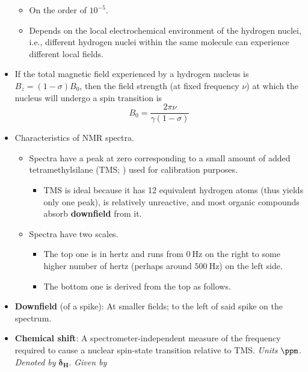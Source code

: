 \documentclass[../notes.tex]{subfiles}
\begin{document}
\begin{itemize}
    \begin{itemize}
        \item On the order of $10^{-5}$.
        \item {}Depends on the local electrochemical environment of the hydrogen nuclei, i.e., different hydrogen nuclei within the same molecule can experience different local fields.
    \end{itemize}
    \item If the total magnetic field experienced by a hydrogen nucleus is $B_z=(1-\sigma)B_0$, then the field strength (at fixed frequency $\nu$) at which the nucleus will undergo a spin transition is
    \begin{equation*}
        B_0 = \frac{2\pi\nu}{\gamma(1-\sigma)}
    \end{equation*}
    \item Characteristics of NMR spectra.
    \begin{itemize}
        \item Spectra have a peak at zero corresponding to a small amount of added tetramethylsilane (TMS; ) used for calibration purposes.
        \begin{itemize}
            \item TMS is ideal because it has 12 equivalent hydrogen atoms (thus yields only one peak), is relatively unreactive, and most organic compounds absorb \textbf{downfield} from it.
        \end{itemize}
        \item Spectra have two scales.
        \begin{itemize}
            \item The top one is in hertz and runs from $\SI{0}{\hertz}$ on the right to some higher number of hertz (perhaps around $\SI{500}{\hertz}$) on the left side.
            \item The bottom one is derived from the top as follows.
        \end{itemize}
    \end{itemize}
    \item \textbf{Downfield} (of a spike): At smaller fields; to the left of said spike on the spectrum.
    \item \textbf{Chemical shift}: A spectrometer-independent measure of the frequency required to cause a nuclear spin-state transition relative to TMS. \emph{Units} $\si{\ppm}$. \emph{Denoted by} $\bm{\delta}_\textbf{H}$. \emph{Given by}
    \begin{align*}

\end{align*}
\end{itemize}
\end{document}
